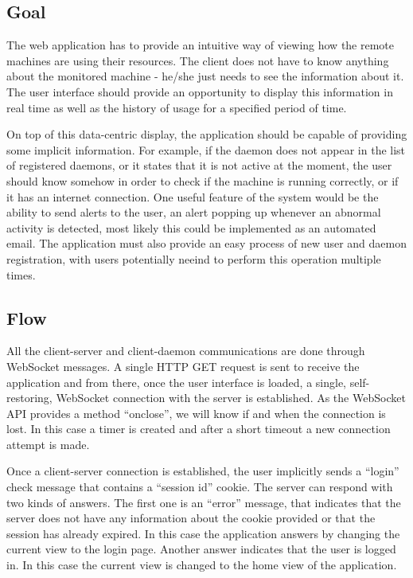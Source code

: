 \documentclass{l3proj}
\begin{document}
\subsection{Goal}

The web application has to provide an intuitive way of viewing how the remote machines are using their resources. The client does not have to know anything about the monitored machine - he/she just needs to see the information about it. The user interface should provide an opportunity to display this information in real time as well as the history of usage for a specified period of time.

On top of this data-centric display, the application should be capable of providing some implicit information. For example, if the daemon does not appear in the list of registered daemons, or it states that it is not active at the moment, the user should know somehow in order to check if the machine is running correctly, or if it has an internet connection. One useful feature of the system would be the ability to send alerts to the user, an alert popping up whenever an abnormal activity is detected, most likely this could be implemented as an automated email. The application must also provide an easy process of new user and daemon registration, with users potentially neeind to perform this operation multiple times.


\subsection{Flow}

All the client-server and client-daemon communications are done through WebSocket messages. A single HTTP GET request is sent to receive the application and from there, once the user interface is loaded, a single, self-restoring, WebSocket connection with the server is established. As the WebSocket API provides a method ``onclose'', we will know if and when the connection is lost. In this case a timer is created and after a short timeout a new connection attempt is made.

Once a client-server connection is established, the user implicitly sends a ``login'' check message that contains a ``session id'' cookie. The server can respond with two kinds of answers. The first one is an ``error'' message, that indicates that the server does not have any information about the cookie provided or that the session has already expired. In this case the application answers by changing the current view to the login page. Another answer indicates that the user is logged in. In this case the current view is changed to the home view of the application.
\end{document}
